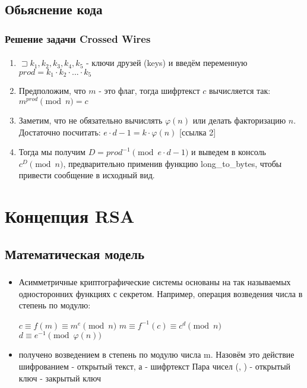 \documentclass[t]{beamer}
\begin{document}
\subsection{Обьяснение кода}

\begin{frame}
	\frametitle{Решение задачи Crossed Wires}
	\framesubtitle{\insertsubsection}
    \begin{enumerate}
        \item<1-> $\sqsupset k_1, k_2, k_3, k_4, k_5$ - ключи друзей (keys) и введём переменную $prod = k_1 \cdot k_2 \cdot ... \cdot k_5$
        \item<2-> Предположим, что $m$ - это флаг, тогда шифртекст $c$ вычисляется так: \( m^{prod} \pmod {n} = c \)
        \item<3-> Заметим, что не обязательно вычислять $\varphi(n)$ или делать факторизацию $n$. Достаточно посчитать: $e \cdot d - 1 = k \cdot \varphi(n)$ [ссылка 2]
        \item<4-> Тогда мы получим $D = prod^{-1} \pmod {e \cdot d - 1}$ и выведем в консоль $c^D \pmod{n}$, предварительно применив функцию long\_to\_bytes, чтобы привести сообщение в исходный вид.
    \end{enumerate}
\end{frame}

\section{Концепция RSA}
\subsection{Математическая модель}

\begin{frame}[t] %
	\frametitle{\insertsection}
	\framesubtitle{\insertsubsection}
	\begin{itemize}
		\item<1-> Асимметричные криптографические системы основаны на так называемых односторонних функциях с секретом.\newline 
		Например, операция возведения числа в степень по модулю: \newline 
		\begin{center} \( c\equiv f(m) \equiv m^e \pmod{n} \) \newline
		\( m\equiv f^{-1}(c) \equiv c^d \pmod{n} \) \newline 
		\( d\equiv e^{-1} \pmod{\varphi(n)} \) \newline \end{center}
		\item<2->  получено возведением в степень по модулю числа m. Назовём это действие шифрованием
		\newline 
		 - открытый текст, а  - шифртекст
		\newline 
		Пара чисел (, ) - открытый ключ
		\newline
		 - закрытый ключ 
	\end{itemize}
\end{frame}
\end{document}
